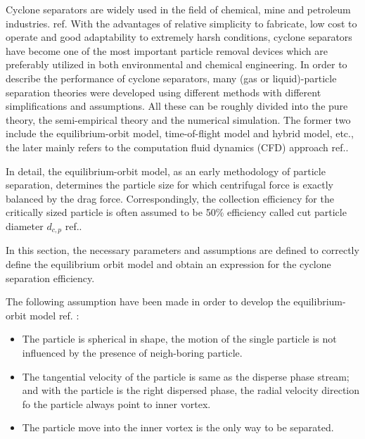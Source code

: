 
Cyclone separators are widely used in the field of chemical, mine and petroleum industries. ref.\cite{Concha2007} With the advantages of relative simplicity to fabricate, low cost to operate and good adaptability to extremely harsh conditions, cyclone separators have become one of the most important particle removal devices which are preferably utilized in both environmental and chemical engineering.
In order to describe the performance of cyclone separators, many (gas or liquid)-particle separation theories were developed using different methods with different simplifications and assumptions.
All these can be roughly divided into the pure theory, the semi-empirical theory and the numerical simulation. The former two include the equilibrium-orbit model, time-of-flight model and hybrid model, etc., the later mainly refers to the computation fluid dynamics (CFD) approach ref.\cite{Altmeyer2003}.

In detail, the equilibrium-orbit model, as an early methodology of particle separation, determines the particle size for which centrifugal force is exactly balanced by the drag force. Correspondingly, the collection efficiency for the critically sized particle is often assumed to be 50\% efficiency called cut particle diameter $d_{c,p}$ ref.\cite{Zhao2011}.

 In this section, the necessary parameters and assumptions are defined to correctly define the equilibrium orbit model and obtain an expression for the cyclone separation efficiency.
 \begin{tcolorbox}[colback=blue!5!white,colframe=blue!75!black,title=Assumptions]
The following assumption have been made in order to develop the equilibrium-orbit model ref. \cite{Wei2016}: 
\begin{itemize}
	\item The particle is spherical in shape, the motion of the single particle is not influenced by the presence of neigh-boring particle.
	\item The tangential velocity of the particle is same as the disperse phase stream; and with the particle is the right dispersed phase, the radial velocity direction fo the particle always point to inner vortex.
	\item  The particle move into the inner vortex is the only way to be separated.  
\end{itemize}
\end{tcolorbox}


